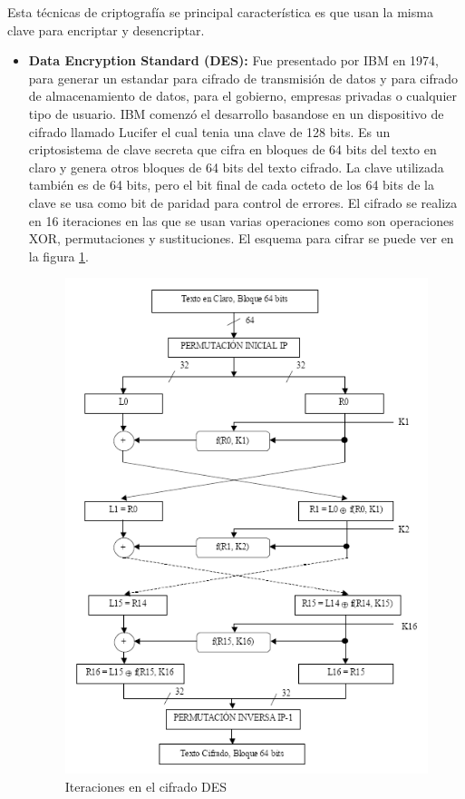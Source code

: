 Esta técnicas de criptografía se principal característica es que usan la misma clave para encriptar y desencriptar.
\begin{itemize}

	\item \textbf{Data Encryption Standard (DES):} Fue presentado por IBM en 1974, para generar un estandar para cifrado de transmisión de datos y para cifrado de almacenamiento de datos, para el gobierno, empresas privadas o cualquier tipo de usuario. IBM comenzó el desarrollo basandose en un dispositivo de cifrado llamado Lucifer el cual tenia una clave de 128 bits. Es un criptosistema de clave secreta que cifra en bloques de 64 bits del texto en claro y genera otros bloques de 64 bits del texto cifrado. La clave utilizada también es de 64 bits, pero el bit final de cada octeto de los 64 bits de la clave se usa como bit de paridad para control de errores. El cifrado se realiza en 16 iteraciones en las que se usan varias operaciones como son operaciones XOR, permutaciones y sustituciones. El esquema para cifrar se puede ver en la figura \ref{fig:cifradoDes}.
	
\begin{figure}
  \centering
    \includegraphics{./ConocimientosPrevios/imagenes/cifradoDes.png}
  \caption{Iteraciones en el cifrado DES}
  \label{fig:cifradoDes}
\end{figure}


\end{itemize}

